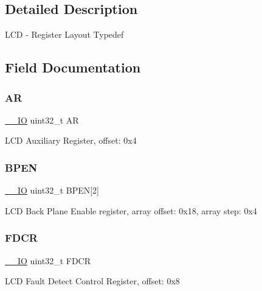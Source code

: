 \subsection{Detailed Description}
L\+CD -\/ Register Layout Typedef 

\subsection{Field Documentation}
\mbox{\label{struct_l_c_d___type_a2ac50357d1ebac2949d27bfc4855e6a4}} 
\subsubsection{\texorpdfstring{AR}{AR}}
{\footnotesize\ttfamily \mbox{\hyperlink{core__cm0plus_8h_aec43007d9998a0a0e01faede4133d6be}{\+\_\+\+\_\+\+IO}} uint32\+\_\+t AR}

L\+CD Auxiliary Register, offset\+: 0x4 \mbox{\label{struct_l_c_d___type_a3027e062c8f29fc0875cebed5d54d586}} 
\subsubsection{\texorpdfstring{BPEN}{BPEN}}
{\footnotesize\ttfamily \mbox{\hyperlink{core__cm0plus_8h_aec43007d9998a0a0e01faede4133d6be}{\+\_\+\+\_\+\+IO}} uint32\+\_\+t B\+P\+EN\mbox{[}2\mbox{]}}

L\+CD Back Plane Enable register, array offset\+: 0x18, array step\+: 0x4 \mbox{\label{struct_l_c_d___type_aaae4fdf0b16483015bdf37fefd65a3ae}} 
\subsubsection{\texorpdfstring{FDCR}{FDCR}}
{\footnotesize\ttfamily \mbox{\hyperlink{core__cm0plus_8h_aec43007d9998a0a0e01faede4133d6be}{\+\_\+\+\_\+\+IO}} uint32\+\_\+t F\+D\+CR}

L\+CD Fault Detect Control Register, offset\+: 0x8 \mbox{\label{struct_l_c_d___type_a60e603662731cb78500abe693fa249ee}} 
